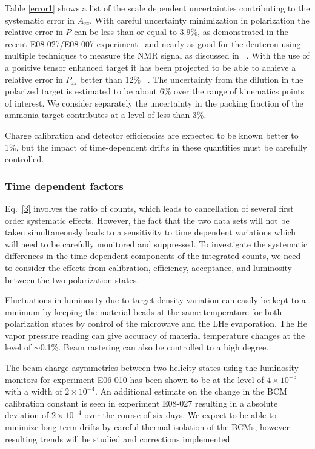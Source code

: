 Table \ref{error1} shows a list of the scale dependent uncertainties contributing to the systematic error in $A_{zz}$.
With careful uncertainty minimization in polarization the relative error in $P$ can be less than or equal to 3.9\%, as demonstrated in the recent E08-027/E08-007 experiment~\cite{NIMDUST} and nearly as good for the deuteron using multiple techniques to measure the NMR signal as discussed in ~\cite{PTSTDUST}.  With the use of a positive tensor enhanced target it has been projected to be able to achieve a relative error in $P_{zz}$ better than 12\% ~\cite{PTSTDUST}.  The uncertainty from the dilution in the polarized target is estimated to be
about 6\% over the range of kinematics points of interest.  We consider separately the uncertainty in the packing fraction of the ammonia target contributes at a level of less than 3\%.

Charge calibration and detector efficiencies are expected to be known better to 1\%, but the impact of time-dependent drifts in these quantities must be carefully controlled.

\subsubsection*{Time dependent factors}
Eq.~\ref{3} involves the ratio of counts, which leads to cancellation of several first order systematic effects.  However, the fact that the two data sets will not be taken simultaneously leads to a sensitivity to time dependent variations which will need to be carefully monitored and suppressed.
%
To investigate the systematic differences in the time dependent components of the integrated counts, we need to consider the effects from calibration, efficiency, acceptance, and luminosity between the two polarization states.

Fluctuations in luminosity due to target density variation can easily be kept to a minimum by keeping the material beads at the same temperature for both polarization states by control of the microwave and the LHe evaporation.  The He vapor pressure reading can give accuracy of material temperature changes at the level of $\sim$0.1\%.
Beam rastering can also be controlled to a high degree.

The beam charge asymmetries between two helicity states using the luminosity monitors for experiment
E06-010 has been shown to be at the level of $4 \times 10^{-5}$ with a width of $2 \times 10^{-4}$.
An additional estimate on the change in the BCM calibration constant is seen in
experiment E08-027 resulting in a absolute deviation of $2 \times 10^{-4}$ over the course of six
days. We expect to be able to minimize long term drifts by careful thermal isolation of
the BCMs, however resulting trends will be studied and corrections implemented.

